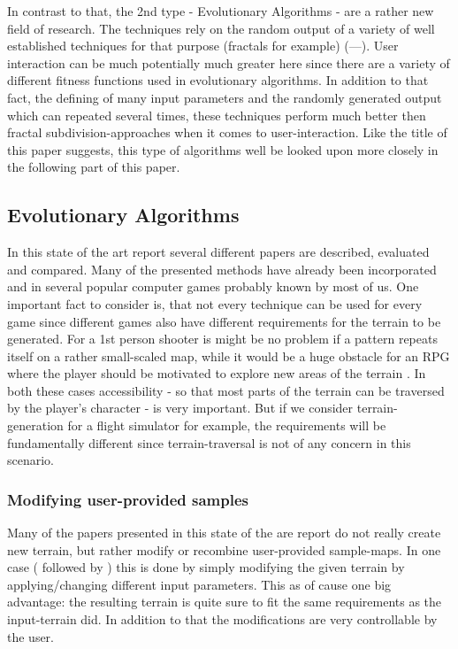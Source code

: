 In contrast to that, the 2nd type - Evolutionary Algorithms - are a rather new field of research. The techniques rely on the random output of a variety of well established techniques for that purpose (fractals for example) (---). User interaction can be much potentially much greater here since there are a variety of different fitness functions used in evolutionary algorithms. In addition to that fact, the defining of many input parameters and the randomly generated output which can repeated several times, these techniques perform much better then fractal subdivision-approaches when it comes to user-interaction. Like the title of this paper suggests, this type of algorithms well be looked upon more closely in the following part of this paper.

\subsection{Evolutionary Algorithms}
In this state of the art report \cite{raffe2012survey} several different papers are described, evaluated and compared. Many of the presented methods have already been incorporated and in several popular computer games probably known by most of us. One important fact to consider is, that not every technique can be used for every game since different games also have different requirements for the terrain to be generated. For a 1st person shooter is might be no problem if a pattern repeats itself on a rather small-scaled map, while it would be a huge obstacle for an RPG where the player should be motivated to explore new areas of the terrain \cite{raffe2012survey}. In both these cases accessibility - so that most parts of the terrain can be traversed by the player's character - is very important. But if we consider terrain-generation for a flight simulator for example, the requirements will be fundamentally different since terrain-traversal is not of any concern in this scenario.

\subsubsection{Modifying user-provided samples}
Many of the papers presented in this state of the are report do not really create new terrain, but rather modify or recombine user-provided sample-maps. In one case (\cite{walsh2010terrain} followed by \cite{walsh2011use}) this is done by simply modifying the given terrain by applying/changing different input parameters. This as of cause one big advantage: the resulting terrain is quite sure to fit the same requirements as the input-terrain did. In addition to that the modifications are very controllable by the user.


